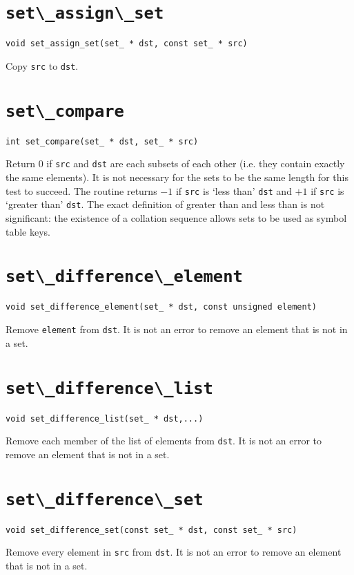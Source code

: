 \section{\protect\verb+set\_assign\_set+}
\begin{verbatim}
void set_assign_set(set_ * dst, const set_ * src)
\end{verbatim}
Copy {\tt src} to {\tt dst}.

\section{\protect\verb+set\_compare+}
\begin{verbatim}
int set_compare(set_ * dst, set_ * src)
\end{verbatim}
Return 0 if {\tt src} and {\tt dst} are each subsets of each other (i.e.
they contain exactly the same elements). It is not necessary for the
sets to be the same length for this test to succeed. The routine returns
$-1$ if {\tt src} is `less than' {\tt dst} and $+1$ if {\tt src} is
`greater than' {\tt dst}. The exact definition of greater than and less
than is not significant: the existence of a collation sequence allows
sets to be used as symbol table keys.

\section{\protect\verb+set\_difference\_element+}
\begin{verbatim}
void set_difference_element(set_ * dst, const unsigned element)
\end{verbatim}
Remove {\tt element} from {\tt dst}.  It is not an
error to remove an element that is not in a set.

\section{\protect\verb+set\_difference\_list+}
\begin{verbatim}
void set_difference_list(set_ * dst,...)
\end{verbatim}
Remove each member of the list of elements from {\tt dst}. It is not an
error to remove an element that is not in a set.

\section{\protect\verb+set\_difference\_set+}
\begin{verbatim}
void set_difference_set(const set_ * dst, const set_ * src)
\end{verbatim}
Remove every element in {\tt src} from {\tt dst}.  It is not an
error to remove an element that is not in a set.

